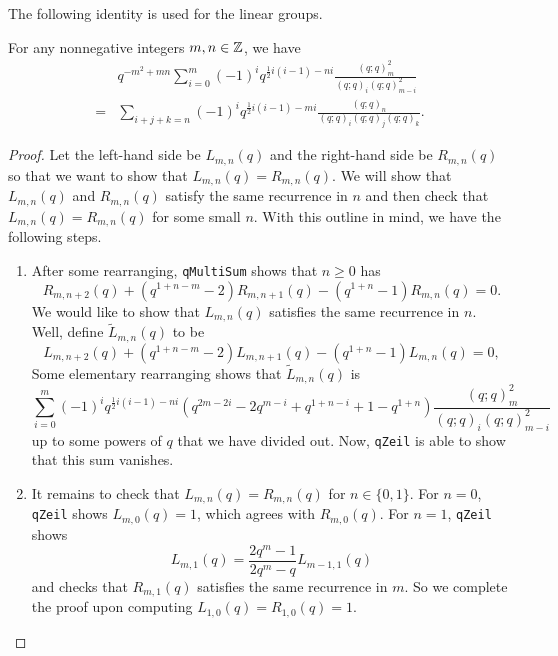 The following identity is used for the linear groups.
\begin{proposition} \label{prop:gl-q-identity}
    For any nonnegative integers $m,n\in\mathbb Z$, we have
    \begin{align*}
        &q^{-m^{2}+mn}\sum_{i=0}^{m}\left(-1\right)^{i}q^{\frac{1}{2}i\left(i-1\right)-ni}\frac{\left(q;q\right)_m^{2}}{\left(q;q\right)_i\left(q;q\right)_{m-i}^{2}} \\
        ={}&\sum_{i+j+k=n}\left(-1\right)^{i}q^{\frac{1}{2}i\left(i-1\right)-mi}\frac{\left(q;q\right)_n}{\left(q;q\right)_i\left(q;q\right)_j\left(q;q\right)_k}.
    \end{align*}
\end{proposition}
\begin{proof}
    Let the left-hand side be $L_{m,n}(q)$ and the right-hand side be $R_{m,n}(q)$ so that we want to show that $L_{m,n}(q)=R_{m,n}(q)$. We will show that $L_{m,n}(q)$ and $R_{m,n}(q)$ satisfy the same recurrence in $n$ and then check that $L_{m,n}(q)=R_{m,n}(q)$ for some small $n$. With this outline in mind, we have the following steps.
    \begin{enumerate}
        \item After some rearranging, \texttt{qMultiSum} shows that $n\ge0$ has
        \[R_{m,n+2}\left(q\right)+\left(q^{1+n-m}-2\right)R_{m,n+1}\left(q\right)-\left(q^{1+n}-1\right)R_{m,n}\left(q\right)=0.\]
        We would like to show that $L_{m,n}(q)$ satisfies the same recurrence in $n$. Well, define $\widetilde L_{m,n}(q)$ to be
        \[L_{m,n+2}\left(q\right)+\left(q^{1+n-m}-2\right)L_{m,n+1}\left(q\right)-\left(q^{1+n}-1\right)L_{m,n}\left(q\right)=0,\]
        Some elementary rearranging shows that $\widetilde L_{m,n}(q)$ is
        \[\sum_{i=0}^{m}\left(-1\right)^{i}q^{\frac{1}{2}i\left(i-1\right)-ni}\left(q^{2m-2i}-2q^{m-i}+q^{1+n-i}+1-q^{1+n}\right)\frac{\left(q;q\right)_m^{2}}{(q;q)_i(q;q)_{m-i}^{2}}\]
        up to some powers of $q$ that we have divided out. Now, \texttt{qZeil} is able to show that this sum vanishes.
        \item It remains to check that $L_{m,n}(q)=R_{m,n}(q)$ for $n\in\{0,1\}$. For $n=0$, \texttt{qZeil} shows $L_{m,0}(q)=1$, which agrees with $R_{m,0}(q)$. For $n=1$, \texttt{qZeil} shows
        \[L_{m,1}(q)=\frac{2q^m-1}{2q^m-q}L_{m-1,1}(q)\]
        and checks that $R_{m,1}(q)$ satisfies the same recurrence in $m$. So we complete the proof upon computing $L_{1,0}(q)=R_{1,0}(q)=1$.
        \qedhere
    \end{enumerate}
\end{proof}
